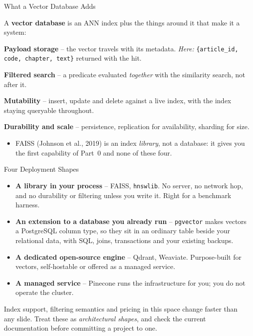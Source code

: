 \begin{frame}{What a Vector Database Adds}
\begin{rldefinition}
A \textbf{vector database} is an ANN index plus the things around it that make it a system:

\smallskip
\textbf{Payload storage} -- the vector travels with its metadata. \emph{Here:} \texttt{\{article\_id, code, chapter, text\}} returned with the hit.

\smallskip
\textbf{Filtered search} -- a predicate evaluated \emph{together} with the similarity search, not after it.

\smallskip
\textbf{Mutability} -- insert, update and delete against a live index, with the index staying queryable throughout.

\smallskip
\textbf{Durability and scale} -- persistence, replication for availability, sharding for size.
\end{rldefinition}
\pause
\begin{itemize}
  \item FAISS (Johnson et al., 2019) is an index \emph{library}, not a database: it gives you the first capability of Part~0 and none of these four.
\end{itemize}
\end{frame}

\begin{frame}{Four Deployment Shapes}
\small
\begin{itemize}
  \item \textbf{A library in your process} -- FAISS, \texttt{hnswlib}. No server, no network hop, and no durability or filtering unless you write it. Right for a benchmark harness.
  \pause
  \item \textbf{An extension to a database you already run} -- \texttt{pgvector} makes vectors a PostgreSQL column type, so they sit in an ordinary table beside your relational data, with SQL, joins, transactions and your existing backups.
  \pause
  \item \textbf{A dedicated open-source engine} -- Qdrant, Weaviate. Purpose-built for vectors, self-hostable or offered as a managed service.
  \pause
  \item \textbf{A managed service} -- Pinecone runs the infrastructure for you; you do not operate the cluster.
\end{itemize}
\pause
\begin{rlpitfall}
Index support, filtering semantics and pricing in this space change faster than any slide. Treat these as \emph{architectural shapes}, and check the current documentation before committing a project to one.
\end{rlpitfall}
\end{frame}

